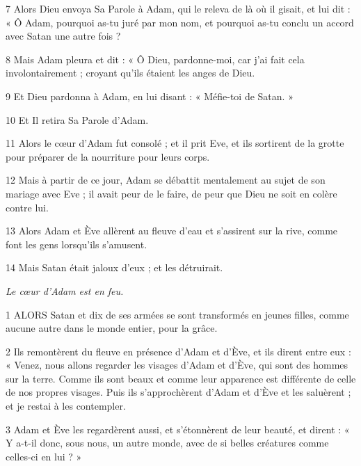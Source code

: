 \par 7 Alors Dieu envoya Sa Parole à Adam, qui le releva de là où il gisait, et lui dit : « Ô Adam, pourquoi as-tu juré par mon nom, et pourquoi as-tu conclu un accord avec Satan une autre fois ?

\par 8 Mais Adam pleura et dit : « Ô Dieu, pardonne-moi, car j'ai fait cela involontairement ; croyant qu'ils étaient les anges de Dieu.

\par 9 Et Dieu pardonna à Adam, en lui disant : « Méfie-toi de Satan. »

\par 10 Et Il retira Sa Parole d'Adam.

\par 11 Alors le cœur d'Adam fut consolé ; et il prit Eve, et ils sortirent de la grotte pour préparer de la nourriture pour leurs corps.

\par 12 Mais à partir de ce jour, Adam se débattit mentalement au sujet de son mariage avec Eve ; il avait peur de le faire, de peur que Dieu ne soit en colère contre lui.

\par 13 Alors Adam et Ève allèrent au fleuve d'eau et s'assirent sur la rive, comme font les gens lorsqu'ils s'amusent.

\par 14 Mais Satan était jaloux d'eux ; et les détruirait.


\par \textit{Le cœur d'Adam est en feu.}

\par 1 ALORS Satan et dix de ses armées se sont transformés en jeunes filles, comme aucune autre dans le monde entier, pour la grâce.

\par 2 Ils remontèrent du fleuve en présence d'Adam et d'Ève, et ils dirent entre eux : « Venez, nous allons regarder les visages d'Adam et d'Ève, qui sont des hommes sur la terre. Comme ils sont beaux et comme leur apparence est différente de celle de nos propres visages. Puis ils s'approchèrent d'Adam et d'Ève et les saluèrent ; et je restai à les contempler.

\par 3 Adam et Ève les regardèrent aussi, et s'étonnèrent de leur beauté, et dirent : « Y a-t-il donc, sous nous, un autre monde, avec de si belles créatures comme celles-ci en lui ? »

